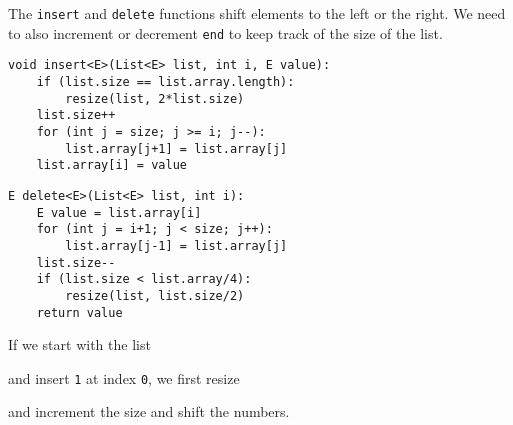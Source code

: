 \documentclass[a4paper, openany]{memoir}
\begin{document}
\noindent The \texttt{insert} and \texttt{delete} functions shift elements to the left or the right. We need to also increment or decrement \texttt{end} to keep track of the size of the list.
\begin{lstlisting}[language=pseudocode]
void insert<E>(List<E> list, int i, E value):
    if (list.size == list.array.length):
        resize(list, 2*list.size)
    list.size++
    for (int j = size; j >= i; j--):
        list.array[j+1] = list.array[j]
    list.array[i] = value
\end{lstlisting}
\begin{lstlisting}[language=pseudocode]
E delete<E>(List<E> list, int i):
    E value = list.array[i]
    for (int j = i+1; j < size; j++):
        list.array[j-1] = list.array[j]
    list.size--
    if (list.size < list.array/4):
        resize(list, list.size/2)
    return value
\end{lstlisting}
If we start with the list
\begin{center}
\end{center}
and insert \texttt{1} at index \texttt{0}, we first resize 
\begin{center}
\end{center}
and increment the size and shift the numbers.
\begin{center}
\end{center}
\end{document}
